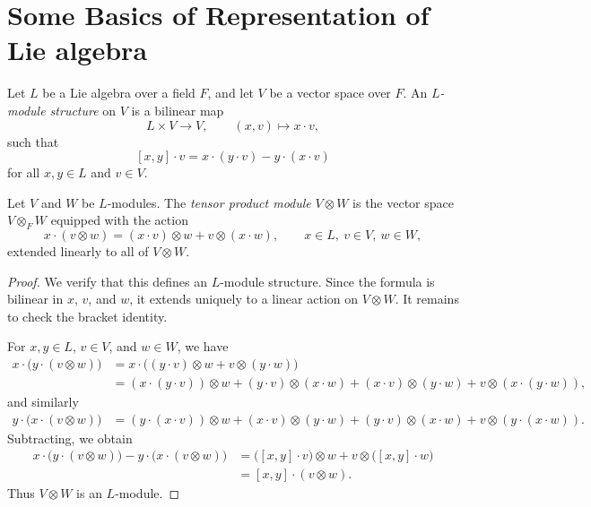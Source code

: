 \section{Some Basics of Representation of Lie algebra}

\begin{definition}
    Let \(L\) be a Lie algebra over a field \(F\), and let \(V\) be a vector space over \(F\).
    An \emph{\(L\)-module structure} on \(V\) is a bilinear map
    \[
        L\times V \to V,\qquad (x,v)\mapsto x\cdot v,
    \]
    such that
    \[
        [x,y]\cdot v = x\cdot (y\cdot v)-y\cdot (x\cdot v)
    \]
    for all \(x,y\in L\) and \(v\in V\).
\end{definition}

\begin{definition}
    Let \(V\) and \(W\) be \(L\)-modules. The \emph{tensor product module}
    \(V\otimes W\) is the vector space \(V\otimes_F W\) equipped with the action
    \[
        x\cdot (v\otimes w)=(x\cdot v)\otimes w+v\otimes (x\cdot w),
        \qquad x\in L,\ v\in V,\ w\in W,
    \]
    extended linearly to all of \(V\otimes W\).
\end{definition}

\begin{proof}
    We verify that this defines an \(L\)-module structure. Since the formula is bilinear in
    \(x\), \(v\), and \(w\), it extends uniquely to a linear action on \(V\otimes W\).
    It remains to check the bracket identity.

    For \(x,y\in L\), \(v\in V\), and \(w\in W\), we have
    \begin{align*}
        x\cdot \bigl(y\cdot (v\otimes w)\bigr)
         & =x\cdot \bigl((y\cdot v)\otimes w+v\otimes (y\cdot w)\bigr) \\
         & =(x\cdot (y\cdot v))\otimes w+(y\cdot v)\otimes (x\cdot w)
        +(x\cdot v)\otimes (y\cdot w)+v\otimes (x\cdot (y\cdot w)),
    \end{align*}
    and similarly
    \begin{align*}
        y\cdot \bigl(x\cdot (v\otimes w)\bigr)
         & =(y\cdot (x\cdot v))\otimes w+(x\cdot v)\otimes (y\cdot w)
        +(y\cdot v)\otimes (x\cdot w)+v\otimes (y\cdot (x\cdot w)).
    \end{align*}
    Subtracting, we obtain
    \begin{align*}
        x\cdot \bigl(y\cdot (v\otimes w)\bigr)-y\cdot \bigl(x\cdot (v\otimes w)\bigr)
         & =\bigl([x,y]\cdot v\bigr)\otimes w+v\otimes \bigl([x,y]\cdot w\bigr) \\
         & =[x,y]\cdot (v\otimes w).
    \end{align*}
    Thus \(V\otimes W\) is an \(L\)-module.
\end{proof}

